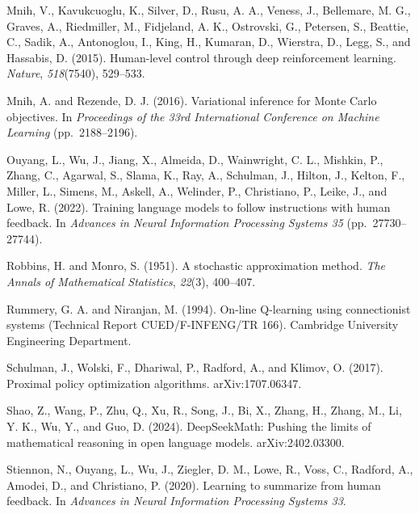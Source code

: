 \begin{list}{}{%
  \setlength{\leftmargin}{1.6em}%
  \setlength{\itemindent}{-1.6em}%
  \setlength{\itemsep}{0.55em}%
  \setlength{\parsep}{0pt}%
  \setlength{\topsep}{0.6em}%
}
\item{}\label{cite:mnih2015}%
Mnih, V., Kavukcuoglu, K., Silver, D., Rusu, A. A., Veness, J., Bellemare, M. G., Graves, A., Riedmiller, M., Fidjeland, A. K., Ostrovski, G., Petersen, S., Beattie, C., Sadik, A., Antonoglou, I., King, H., Kumaran, D., Wierstra, D., Legg, S., and Hassabis, D. (2015). Human-level control through deep reinforcement learning. \textit{Nature}, \textit{518}(7540), 529--533.

\item{}\label{cite:mnih2016}%
Mnih, A. and Rezende, D. J. (2016). Variational inference for Monte Carlo objectives. In \textit{Proceedings of the 33rd International Conference on Machine Learning} (pp.\ 2188--2196).

\item{}\label{cite:ouyang2022}%
Ouyang, L., Wu, J., Jiang, X., Almeida, D., Wainwright, C. L., Mishkin, P., Zhang, C., Agarwal, S., Slama, K., Ray, A., Schulman, J., Hilton, J., Kelton, F., Miller, L., Simens, M., Askell, A., Welinder, P., Christiano, P., Leike, J., and Lowe, R. (2022). Training language models to follow instructions with human feedback. In \textit{Advances in Neural Information Processing Systems 35} (pp.\ 27730--27744).

\item{}\label{cite:robbins1951}%
Robbins, H. and Monro, S. (1951). A stochastic approximation method. \textit{The Annals of Mathematical Statistics}, \textit{22}(3), 400--407.

\item{}\label{cite:rummery1994}%
Rummery, G. A. and Niranjan, M. (1994). On-line Q-learning using connectionist systems (Technical Report CUED/F-INFENG/TR 166). Cambridge University Engineering Department.

\item{}\label{cite:schulman2017}%
Schulman, J., Wolski, F., Dhariwal, P., Radford, A., and Klimov, O. (2017). Proximal policy optimization algorithms. arXiv:1707.06347.

\item{}\label{cite:shao2024}%
Shao, Z., Wang, P., Zhu, Q., Xu, R., Song, J., Bi, X., Zhang, H., Zhang, M., Li, Y. K., Wu, Y., and Guo, D. (2024). DeepSeekMath: Pushing the limits of mathematical reasoning in open language models. arXiv:2402.03300.

\item{}\label{cite:stiennon2020}%
Stiennon, N., Ouyang, L., Wu, J., Ziegler, D. M., Lowe, R., Voss, C., Radford, A., Amodei, D., and Christiano, P. (2020). Learning to summarize from human feedback. In \textit{Advances in Neural Information Processing Systems 33}.


\end{list}
